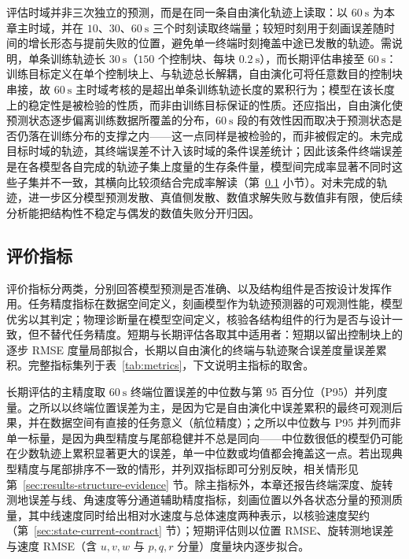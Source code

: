 评估时域并非三次独立的预测，而是在同一条自由演化轨迹上读取：以 \(60~\mathrm{s}\) 为本章主时域，并在 \(10\)、\(30\)、\(60~\mathrm{s}\) 三个时刻读取终端量；较短时刻用于刻画误差随时间的增长形态与提前失败的位置，避免单一终端时刻掩盖中途已发散的轨迹。需说明，单条训练轨迹长 \(30~\mathrm{s}\)（\(150\) 个控制块、每块 \(0.2~\mathrm{s}\)），而长期评估串接至 \(60~\mathrm{s}\)：训练目标定义在单个控制块上、与轨迹总长解耦，自由演化可将任意数目的控制块串接，故 \(60~\mathrm{s}\) 主时域考核的是超出单条训练轨迹长度的累积行为；模型在该长度上的稳定性是被检验的性质，而非由训练目标保证的性质。还应指出，自由演化使预测状态逐步偏离训练数据所覆盖的分布，\(60~\mathrm{s}\) 段的有效性因而取决于预测状态是否仍落在训练分布的支撑之内——这一点同样是被检验的，而非被假定的。未完成目标时域的轨迹，其终端误差不计入该时域的条件误差统计；因此该条件终端误差是在各模型各自完成的轨迹子集上度量的生存条件量，模型间完成率显著不同时这些子集并不一致，其横向比较须结合完成率解读（第~\ref{subsec:metrics} 小节）。对未完成的轨迹，进一步区分模型预测发散、真值侧发散、数值求解失败与数值非有限，使后续分析能把结构性不稳定与偶发的数值失败分开归因。

\subsection{评价指标}
\label{subsec:metrics}

评价指标分两类，分别回答模型预测是否准确、以及结构组件是否按设计发挥作用。任务精度指标在数据空间定义，刻画模型作为轨迹预测器的可观测性能，模型优劣以其判定；物理诊断量在模型空间定义，核验各结构组件的行为是否与设计一致，但不替代任务精度。短期与长期评估各取其中适用者：短期以留出控制块上的逐步 RMSE 度量局部拟合，长期以自由演化的终端与轨迹聚合误差度量误差累积。完整指标集列于表~\ref{tab:metrics}，下文说明主指标的取舍。

长期评估的主精度取 \(60~\mathrm{s}\) 终端位置误差的中位数与第 95 百分位（P95）并列度量。之所以以终端位置误差为主，是因为它是自由演化中误差累积的最终可观测后果，并在数据空间有直接的任务意义（航位精度）；之所以中位数与 P95 并列而非单一标量，是因为典型精度与尾部稳健并不总是同向——中位数很低的模型仍可能在少数轨迹上累积显著更大的误差，单一中位数或均值都会掩盖这一点。若出现典型精度与尾部排序不一致的情形，并列双指标即可分别反映，相关情形见第~\ref{sec:results-structure-evidence} 节。除主指标外，本章还报告终端深度、旋转测地误差与线、角速度等分通道辅助精度指标，刻画位置以外各状态分量的预测质量，其中线速度同时给出相对水速度与总体速度两种表示，以核验速度契约（第~\ref{sec:state-current-contract} 节）；短期评估则以位置 RMSE、旋转测地误差与速度 RMSE（含 \(u,v,w\) 与 \(p,q,r\) 分量）度量块内逐步拟合。

